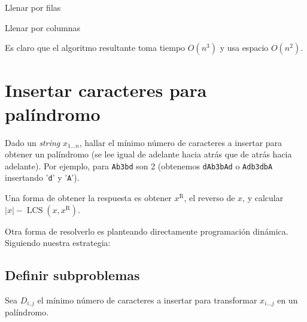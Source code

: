 \begin{description}
\begin{algorithm}

       \caption{Llenar por filas}
       \label{alg:opt-BST-2}
     \end{algorithm}
     \begin{algorithm}
       \DontPrintSemicolon\Indp


       \caption{Llenar por columnas}
       \label{alg:opt-BST-3}
     \end{algorithm}
   \end{description}
   Es claro que el algoritmo resultante toma tiempo \(O(n^3)\)
   y usa espacio \(O(n^2)\).

\section{Insertar caracteres para palíndromo}
\label{sec:insert-palindrome}

  Dado un \emph{\foreignlanguage{english}{string}}
  \(x_{1 \ldots n}\),
  hallar el mínimo número de caracteres a insertar para obtener un palíndromo
  (se lee igual de adelante hacia atrás que de atrás hacia adelante).
  Por ejemplo,
  para \texttt{Ab3bd} son \num{2}
  (obtenemos \texttt{dAb3bAd} o \texttt{Adb3dbA}
   insertando '\texttt{d}' y '\texttt{A}').

  Una forma de obtener la respuesta es obtener \(x^{\mathrm{R}}\),
  el reverso de \(x\),
  y calcular
    \(\lvert x \rvert - \mathrm{\operatorname{LCS}}(x, x^{\mathrm{R}})\).

  Otra forma de resolverlo es planteando directamente
  programación dinámica.
  Siguiendo nuestra estrategia:

\subsection{Definir subproblemas}
\label{sec:definir-subproblemas}

  Sea \(D_{i,j}\) el mínimo número de caracteres a insertar
  para transformar \(x_{i \ldots j}\) en un palíndromo.

